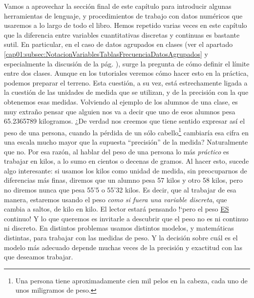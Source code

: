 Vamos a aprovechar la sección final de este capítulo para introducir algunas herramientas de lenguaje, y procedimientos de trabajo con datos
numéricos que usaremos a lo largo de todo el libro. Hemos repetido varias veces en este capítulo que la diferencia entre variables cuantitativas discretas y continuas es bastante sutil. En particular, en el caso de datos agrupados en clases (ver el apartado
\ref{cap01:subsec:NotacionVariablesTablasFrecuenciaDatosAgrupados} y especialmente la discusión de la pág. \pageref{cap01:tabla:FrecuenciaPesoClase}),
surge la pregunta de cómo definir el límite entre dos clases. Aunque en los tutoriales veremos cómo hacer esto en la práctica, podemos preparar el terreno. Esta cuestión, a su vez, está estrechamente ligada a la cuestión de las unidades de medida
que se utilizan, y de la precisión con la que obtenemos esas medidas. Volviendo al ejemplo de los alumnos de una clase, es muy extraño pensar que
alguien nos va a decir que uno de esos alumnos pesa 65.2365789 kilogramos. ¿De verdad nos creemos que tiene sentido expresar así el peso de una
persona, cuando la pérdida de un sólo cabello\footnote{Una persona tiene aproximadamente cien mil pelos en la cabeza, cada uno de unos miligramos de peso.} cambiaría esa cifra en una
escala mucho mayor que la supuesta ``precisión'' de la medida? Naturalmente que no. Por esa razón, al hablar del peso de una persona lo más
{\em práctico} es trabajar en kilos, a lo sumo en cientos o decenas de gramos. Al hacer esto, sucede algo interesante: si usamos los kilos como
unidad de medida, sin preocuparnos de diferencias más finas, diremos que un alumno pesa 57 kilos y otro 58 kilos, pero no diremos nunca que pesa 55'5
o 55'32 kilos. Es decir, que al trabajar de esa manera, estaremos usando el peso {\em como si fuera una variable discreta}, que cambia a saltos, de
kilo en kilo. El lector estará pensando {!`}pero el peso \underline{ES} continuo! Y lo que queremos es invitarle a descubrir que el peso no es ni
continuo ni discreto. En distintos problemas usamos distintos modelos, y matemáticas distintas, para trabajar con las medidas de peso. Y la decisión
sobre cuál es el modelo más adecuado depende muchas veces de la precisión y exactitud con las que deseamos trabajar.

